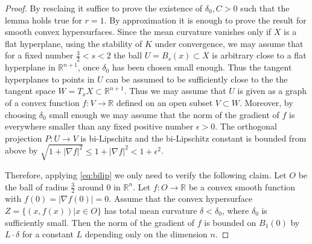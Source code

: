 \documentclass[12pt,leqno,intlimits]{amsart}
\numberwithin{equation}{section}
\theoremstyle{definition}
\theoremstyle{remark}
\newcommand{\R}{\mathbb{R}}
\begin{document}
\begin{proof}
By resclaing it suffice to prove the existence of $\delta _0, C>0$ such that the lemma holds true for $r=1$.
By approximation it is enough to prove the result for smooth convex hypersurfaces.  Since the mean curvature vanishes only
if $X$ is a flat hyperplane, using the stability of $K$ under convergence, we may assume that  for a fixed number $\frac 3 2<s<2$ the ball $U=B_{s} (x) \subset X$ is arbitrary close
to a flat hyperplane in $\R^{n+1}$, once $\delta _0$ has been chosen small enough.  Thus the tangent hyperplanes  to points in $U$  can be assumed to be sufficiently close to the the tangent
space  $W =T_xX \subset \R^{n+1}$. Thus we may assume that $U$ is given as a graph  of a convex function $f:V\to \R$ defined on an open subset $V\subset W$.
Moreover, by choosing $\delta _0$ small enough we may assume
that the norm of the  gradient of $f$ is everywhere smaller than any fixed positive number $\epsilon >0$.
The orthogonal projection $P:U \to V$ is bi-Lipschitz and the bi-Lipschitz constant is bounded from above by $\sqrt {1+ |\nabla f|^2} \leq 1+ |\nabla f| ^2 <1+\epsilon ^2$.

Therefore, applying \eqref{eq:bilip} we only need to verify the following claim.  Let $O$ be the ball of radius $\frac 3 2$ around $0$ in $\R^n$. Let $f:O\to \R$ be a convex  smooth function
with $f(0)=|\nabla f (0)|=0$. Assume that the convex hypersurface $Z= \{(x,f(x)) | x\in O \}$ has total mean curvature $\delta <\delta _0$, where $\delta _0$ is sufficiently small.
Then the norm of the gradient of $f$ is bounded on $B_1 (0)$ by $L\cdot \delta$ for a constant $L$ depending only on the dimension $n$.
\end{proof}
\end{document}
